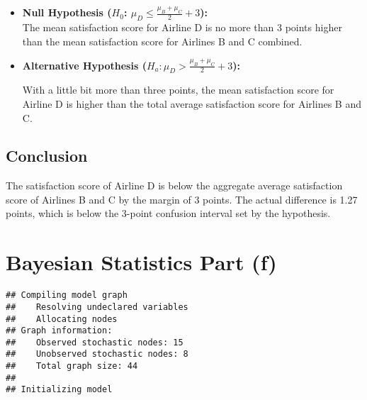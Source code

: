 \documentclass[
]{article}
\begin{document}
\begin{itemize}
\item
  \textbf{Null Hypothesis (\(H_0\):
  \(\mu_D \leq \frac{\mu_{B} + \mu_{C}}{2} + 3\)):}\\
  The mean satisfaction score for Airline D is no more than 3 points
  higher than the mean satisfaction score for Airlines B and C combined.
\item
  \textbf{Alternative Hypothesis
  (\(H_a: \mu_D > \frac{\mu_B + \mu_C}{2} + 3\)):}

  With a little bit more than three points, the mean satisfaction score
  for Airline D is higher than the total average satisfaction score for
  Airlines B and C.
\end{itemize}

\subsection{Conclusion}\label{conclusion-1}

The satisfaction score of Airline D is below the aggregate average
satisfaction score of Airlines B and C by the margin of 3 points. The
actual difference is 1.27 points, which is below the 3-point confusion
interval set by the hypothesis.

\section{Bayesian Statistics Part (f)}\label{bayesian-statistics-part-f}

\begin{verbatim}
## Compiling model graph
##    Resolving undeclared variables
##    Allocating nodes
## Graph information:
##    Observed stochastic nodes: 15
##    Unobserved stochastic nodes: 8
##    Total graph size: 44
## 
## Initializing model
\end{verbatim}
\end{document}
